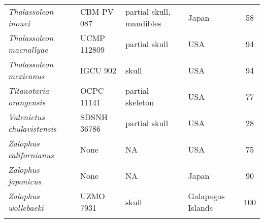 \begin{longtable}{p{}p{}p{}lc}
\textit{Thalassoleon inouei} &	CBM-PV 087 & 	partial skull, mandibles & 	Japan & 58\\
\textit{Thalassoleon macnallyae} &	UCMP 112809 & 	partial skull & 	USA & 94\\
\textit{Thalassoleon mexicanus} &	IGCU 902 & 	skull & 	USA & 94\\
\textit{Titanotaria orangensis} &	OCPC 11141 & 	partial skeleton & 	USA & 77\\
\textit{Valenictus chulavistensis} &	SDSNH 36786 & 	partial skull & 	USA & 28\\
\textit{Zalophus californianus} &	None & 	NA & 	USA	 & 75\\
\textit{Zalophus japonicus} &	None & 	NA & 	Japan & 90\\
\textit{Zalophus wollebaeki} &	UZMO 7931 & skull & 	Galapagos Islands & 100\\
\hline

\label{table-taxa}
\end{longtable}
